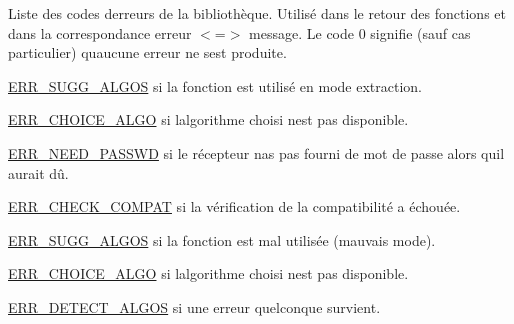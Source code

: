 
\begin{DoxyRefList}
\item[\label{a00134__errors000008}%
\Hypertarget{a00134__errors000008}%
Global(e) \hyperlink{a00011_a08b18ac8af0f3462354240d9732f3852}{err\+\_\+code} ]Liste des codes d\textquotesingle{}erreurs de la bibliothèque. Utilisé dans le retour des fonctions et dans la correspondance erreur $<$=$>$ message. Le code 0 signifie (sauf cas particulier) qu\textquotesingle{}aucune erreur ne s\textquotesingle{}est produite.  
\item[\label{a00134__errors000010}%
\Hypertarget{a00134__errors000010}%
Global(e) \hyperlink{a00131_a5501c9c7711252fa8d85ff12cb3390dc}{fill\+\_\+host\+\_\+info} (info\+\_\+s $\ast$infos)]\hyperlink{a00011_a08b18ac8af0f3462354240d9732f3852a72cfc98feeed9df5050bd2b25d2d28c2}{E\+R\+R\+\_\+\+S\+U\+G\+G\+\_\+\+A\+L\+G\+OS} si la fonction est utilisé en mode extraction. 

\hyperlink{a00011_a08b18ac8af0f3462354240d9732f3852ab79036268630b509f43f01d2082a9154}{E\+R\+R\+\_\+\+C\+H\+O\+I\+C\+E\+\_\+\+A\+L\+GO} si l\textquotesingle{}algorithme choisi n\textquotesingle{}est pas disponible.  
\item[\label{a00134__errors000009}%
\Hypertarget{a00134__errors000009}%
Global(e) \hyperlink{a00050_a4ff8628a8b7e85f4a4b8dda0d66c23b5}{read\+\_\+signature} (info\+\_\+s $\ast$infos)]\hyperlink{a00011_a08b18ac8af0f3462354240d9732f3852a0639f3719d0bf22c36b5ca1711fe3d7e}{E\+R\+R\+\_\+\+N\+E\+E\+D\+\_\+\+P\+A\+S\+S\+WD} si le récepteur n\textquotesingle{}as pas fourni de mot de passe alors qu\textquotesingle{}il aurait dû.  
\item[\label{a00134__errors000002}%
\Hypertarget{a00134__errors000002}%
Global(e) \hyperlink{a00044_aa5b31aaae617d7c5d0c29d564e2c8a42}{stegx\+\_\+check\+\_\+compatibility} (info\+\_\+s $\ast$infos)]\hyperlink{a00011_a08b18ac8af0f3462354240d9732f3852ab4f003f7e2c346374bb7434b940794f8}{E\+R\+R\+\_\+\+C\+H\+E\+C\+K\+\_\+\+C\+O\+M\+P\+AT} si la vérification de la compatibilité a échouée.  
\item[\label{a00134__errors000004}%
\Hypertarget{a00134__errors000004}%
Global(e) \hyperlink{a00128_a58f7de82387e9b66f9bd7c40c32aeb8f}{stegx\+\_\+choose\+\_\+algo} (info\+\_\+s $\ast$infos, algo\+\_\+e algo\+\_\+choosen)]\hyperlink{a00011_a08b18ac8af0f3462354240d9732f3852a72cfc98feeed9df5050bd2b25d2d28c2}{E\+R\+R\+\_\+\+S\+U\+G\+G\+\_\+\+A\+L\+G\+OS} si la fonction est mal utilisée (mauvais mode). 

\hyperlink{a00011_a08b18ac8af0f3462354240d9732f3852ab79036268630b509f43f01d2082a9154}{E\+R\+R\+\_\+\+C\+H\+O\+I\+C\+E\+\_\+\+A\+L\+GO} si l\textquotesingle{}algorithme choisi n\textquotesingle{}est pas disponible.  
\item[\label{a00134__errors000005}%
\Hypertarget{a00134__errors000005}%
Global(e) \hyperlink{a00050_a2a3747fdc90ed4467eb3e468d8fba361}{stegx\+\_\+detect\+\_\+algo} (info\+\_\+s $\ast$infos)]\hyperlink{a00011_a08b18ac8af0f3462354240d9732f3852a65deae87741eaa0b2b39fe1116bfd563}{E\+R\+R\+\_\+\+D\+E\+T\+E\+C\+T\+\_\+\+A\+L\+G\+OS} si une erreur quelconque survient. 


\end{DoxyRefList}
